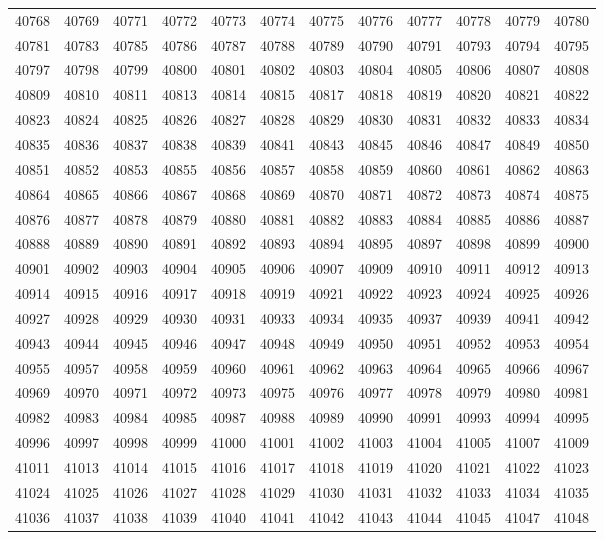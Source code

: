 \begin{center}
\begin{longtable}{llllllllllll}
40768 &40769 &40771 &40772 &40773 &40774 &40775 &40776 &40777 &40778 &40779 &40780 \\
40781 &40783 &40785 &40786 &40787 &40788 &40789 &40790 &40791 &40793 &40794 &40795 \\
40797 &40798 &40799 &40800 &40801 &40802 &40803 &40804 &40805 &40806 &40807 &40808 \\
40809 &40810 &40811 &40813 &40814 &40815 &40817 &40818 &40819 &40820 &40821 &40822 \\
40823 &40824 &40825 &40826 &40827 &40828 &40829 &40830 &40831 &40832 &40833 &40834 \\
40835 &40836 &40837 &40838 &40839 &40841 &40843 &40845 &40846 &40847 &40849 &40850 \\
40851 &40852 &40853 &40855 &40856 &40857 &40858 &40859 &40860 &40861 &40862 &40863 \\
40864 &40865 &40866 &40867 &40868 &40869 &40870 &40871 &40872 &40873 &40874 &40875 \\
40876 &40877 &40878 &40879 &40880 &40881 &40882 &40883 &40884 &40885 &40886 &40887 \\
40888 &40889 &40890 &40891 &40892 &40893 &40894 &40895 &40897 &40898 &40899 &40900 \\
40901 &40902 &40903 &40904 &40905 &40906 &40907 &40909 &40910 &40911 &40912 &40913 \\
40914 &40915 &40916 &40917 &40918 &40919 &40921 &40922 &40923 &40924 &40925 &40926 \\
40927 &40928 &40929 &40930 &40931 &40933 &40934 &40935 &40937 &40939 &40941 &40942 \\
40943 &40944 &40945 &40946 &40947 &40948 &40949 &40950 &40951 &40952 &40953 &40954 \\
40955 &40957 &40958 &40959 &40960 &40961 &40962 &40963 &40964 &40965 &40966 &40967 \\
40969 &40970 &40971 &40972 &40973 &40975 &40976 &40977 &40978 &40979 &40980 &40981 \\
40982 &40983 &40984 &40985 &40987 &40988 &40989 &40990 &40991 &40993 &40994 &40995 \\
40996 &40997 &40998 &40999 &41000 &41001 &41002 &41003 &41004 &41005 &41007 &41009 \\
41011 &41013 &41014 &41015 &41016 &41017 &41018 &41019 &41020 &41021 &41022 &41023 \\
41024 &41025 &41026 &41027 &41028 &41029 &41030 &41031 &41032 &41033 &41034 &41035 \\
41036 &41037 &41038 &41039 &41040 &41041 &41042 &41043 &41044 &41045 &41047 &41048 \\

\end{longtable}
\end{center}
